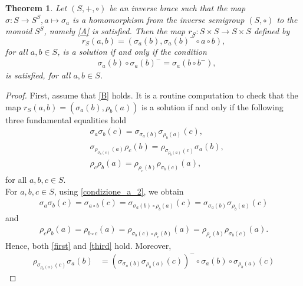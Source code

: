 \documentclass[preprint,1p]{elsarticle}
\newtheorem{theor}{Theorem}[section]
\theoremstyle{definition}               %
\begin{document}
\smallskip



\begin{theor}\label{teo_solu}
  Let $(S, +, \circ)$ be an inverse brace such that the map $\sigma: S \to S^S, a \mapsto \sigma_a$ is a homomorphism from the inverse semigroup $(S, \circ)$ to the monoid $S^S$, namely \eqref{A} is satisfied. Then the map $r_S:S \times S\to S\times S$ defined by $$r_S(a,b)=\left(\sigma_a(b), \sigma_a(b)^- \circ a \circ b\right),$$
 for all $a, b \in S$, is a solution if and only if the condition
    \begin{align}
    &\sigma_a(b)\circ \sigma_a(b)^-=\sigma_a\left(b \circ b^-\right), 
    \tag{II}
    \end{align}
    is satisfied, for all $a, b \in S$.
\end{theor}
\begin{proof}
First, assume that \eqref{B} holds. It is a routine computation to check that the map $r_S(a,b)=(\sigma_a(b), \rho_b(a))$ is a solution if and only if the following three fundamental equalities hold
\begin{align}
     &\label{first} \sigma_a\sigma_b(c)=\sigma_{\sigma_a\left(b\right)}\sigma_{\rho_b\left(a\right)}\left(c\right)\tag{Y1},\\
    &  \label{second}\sigma_{\rho_{\sigma_b\left(c\right)}\left(a\right)}\rho_c\left(b\right)=\rho_{\sigma_{\rho_b\left(a\right)}\left(c\right)}\sigma_a\left(b\right)\tag{Y2},\\
      &\label{third}\rho_c\rho_b(a)=\rho_{\rho_c\left(b\right)}\rho_{\sigma_b\left(c\right)}\left(a\right)\tag{Y3},
  \end{align} 
for all $a,b,c \in S$. \\
For $a, b, c \in S$, using \cref{condizione_a_2}, we obtain 
\begin{align*}
    \sigma_a\sigma_b(c)= \sigma_{a \circ b}(c)=\sigma_{\sigma_a(b)\circ \rho_b(a)}(c)=\sigma_{\sigma_a\left(b\right)}\sigma_{\rho_b\left(a\right)}\left(c\right)
\end{align*}
and
\begin{align*}
    \rho_c\rho_b(a)= \rho_{b \circ c}(a)=\rho_{\sigma_b(c)\circ \rho_c(b)}(a)=\rho_{\rho_c\left(b\right)}\rho_{\sigma_b\left(c\right)}\left(a\right).
\end{align*}
Hence, both \eqref{first} and \eqref{third} hold.
Moreover, 
\begin{align*}
    \rho_{\sigma_{\rho_b(a)}(c)}\sigma_a(b)&=\left(\sigma_{\sigma_a(b)}\sigma_{\rho_b(a)}(c)   \right)^-\circ \sigma_a(b)\circ\sigma_{\rho_b(a)}(c)

\end{align*}
\end{proof}
\end{document}
